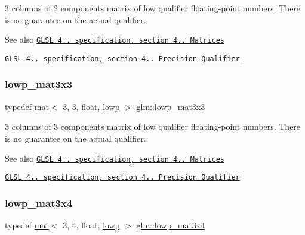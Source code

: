 3 columns of 2 components matrix of low qualifier floating-\/point numbers. There is no guarantee on the actual qualifier.

\begin{DoxySeeAlso}{See also}
\href{http://www.opengl.org/registry/doc/GLSLangSpec.4.20.8.pdf}{\tt G\+L\+SL 4.. specification, section 4.. Matrices} 

\href{http://www.opengl.org/registry/doc/GLSLangSpec.4.20.8.pdf}{\tt G\+L\+SL 4.. specification, section 4.. Precision Qualifier} 
\end{DoxySeeAlso}
\mbox{\label{group__core__precision_ga6880ce658287c90c081aa60fa1f6f0a5}} 
\subsubsection{\texorpdfstring{lowp\+\_\+mat3x3}{lowp\_mat3x3}}
{\footnotesize\ttfamily typedef \hyperlink{structglm_1_1mat}{mat}$<$ 3, 3, float, \hyperlink{namespaceglm_a36ed105b07c7746804d7fdc7cc90ff25ae161af3fc695e696ce3bf69f7332bc2d}{lowp} $>$ \hyperlink{group__core__precision_ga6880ce658287c90c081aa60fa1f6f0a5}{glm\+::lowp\+\_\+mat3x3}}

3 columns of 3 components matrix of low qualifier floating-\/point numbers. There is no guarantee on the actual qualifier.

\begin{DoxySeeAlso}{See also}
\href{http://www.opengl.org/registry/doc/GLSLangSpec.4.20.8.pdf}{\tt G\+L\+SL 4.. specification, section 4.. Matrices} 

\href{http://www.opengl.org/registry/doc/GLSLangSpec.4.20.8.pdf}{\tt G\+L\+SL 4.. specification, section 4.. Precision Qualifier} 
\end{DoxySeeAlso}
\mbox{\label{group__core__precision_ga9340ce338f4e973abeccf7309281ef31}} 
\subsubsection{\texorpdfstring{lowp\+\_\+mat3x4}{lowp\_mat3x4}}
{\footnotesize\ttfamily typedef \hyperlink{structglm_1_1mat}{mat}$<$ 3, 4, float, \hyperlink{namespaceglm_a36ed105b07c7746804d7fdc7cc90ff25ae161af3fc695e696ce3bf69f7332bc2d}{lowp} $>$ \hyperlink{group__core__precision_ga9340ce338f4e973abeccf7309281ef31}{glm\+::lowp\+\_\+mat3x4}}

